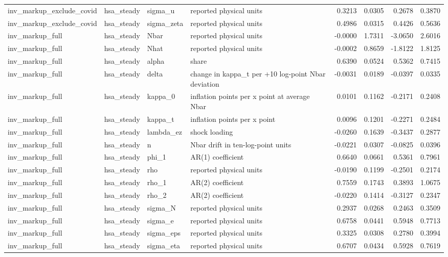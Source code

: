 \begin{tabular}{llllrrrr}
inv\_markup\_exclude\_covid & hsa\_steady & sigma\_u & reported physical units & 0.3213 & 0.0305 & 0.2678 & 0.3870 \\
inv\_markup\_exclude\_covid & hsa\_steady & sigma\_zeta & reported physical units & 0.4986 & 0.0315 & 0.4426 & 0.5636 \\
inv\_markup\_full & hsa\_steady & Nbar & reported physical units & -0.0000 & 1.7311 & -3.0650 & 2.6016 \\
inv\_markup\_full & hsa\_steady & Nhat & reported physical units & -0.0002 & 0.8659 & -1.8122 & 1.8125 \\
inv\_markup\_full & hsa\_steady & alpha & share & 0.6390 & 0.0524 & 0.5362 & 0.7415 \\
inv\_markup\_full & hsa\_steady & delta & change in kappa\_t per +10 log-point Nbar deviation & -0.0031 & 0.0189 & -0.0397 & 0.0335 \\
inv\_markup\_full & hsa\_steady & kappa\_0 & inflation points per x point at average Nbar & 0.0101 & 0.1162 & -0.2171 & 0.2408 \\
inv\_markup\_full & hsa\_steady & kappa\_t & inflation points per x point & 0.0096 & 0.1201 & -0.2271 & 0.2484 \\
inv\_markup\_full & hsa\_steady & lambda\_ez & shock loading & -0.0260 & 0.1639 & -0.3437 & 0.2877 \\
inv\_markup\_full & hsa\_steady & n & Nbar drift in ten-log-point units & -0.0221 & 0.0307 & -0.0825 & 0.0396 \\
inv\_markup\_full & hsa\_steady & phi\_1 & AR(1) coefficient & 0.6640 & 0.0661 & 0.5361 & 0.7961 \\
inv\_markup\_full & hsa\_steady & rho & reported physical units & -0.0190 & 0.1199 & -0.2501 & 0.2174 \\
inv\_markup\_full & hsa\_steady & rho\_1 & AR(2) coefficient & 0.7559 & 0.1743 & 0.3893 & 1.0675 \\
inv\_markup\_full & hsa\_steady & rho\_2 & AR(2) coefficient & -0.0220 & 0.1414 & -0.3127 & 0.2347 \\
inv\_markup\_full & hsa\_steady & sigma\_N & reported physical units & 0.2937 & 0.0268 & 0.2463 & 0.3509 \\
inv\_markup\_full & hsa\_steady & sigma\_e & reported physical units & 0.6758 & 0.0441 & 0.5948 & 0.7713 \\
inv\_markup\_full & hsa\_steady & sigma\_eps & reported physical units & 0.3325 & 0.0308 & 0.2780 & 0.3994 \\
inv\_markup\_full & hsa\_steady & sigma\_eta & reported physical units & 0.6707 & 0.0434 & 0.5928 & 0.7619 \\

\end{tabular}
